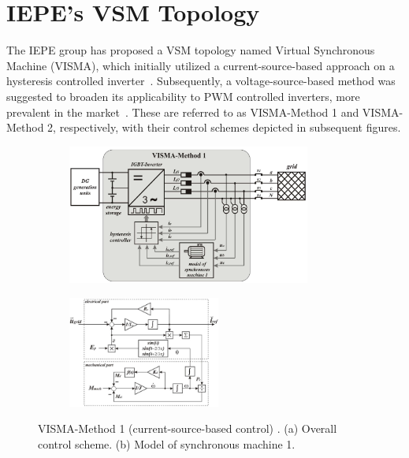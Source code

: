 \section{IEPE's VSM Topology}\label{sec:VISMA}

The IEPE group has proposed a VSM topology named Virtual Synchronous Machine
(VISMA), which initially utilized a current-source-based approach on a
hysteresis controlled inverter~\cite{beck2007vsm,chen2011improving}.
Subsequently, a voltage-source-based method was suggested to broaden its
applicability to PWM controlled inverters, more prevalent in the
market~\cite{chen2012comparison}. These are referred to as VISMA-Method 1 and
VISMA-Method 2, respectively, with their control schemes depicted in subsequent
figures.


\newpage
\begin{figure}[ht!]
    \centering
    \begin{subfigure}[b]{\textwidth}
        \centering
        \includegraphics[width=8cm]{images/VISMA1Concept.png}
        \caption{}
        \label{fig:VISMA1Concept}
    \end{subfigure}

    \begin{subfigure}[b]{\textwidth}
        \centering
        \includegraphics[width=5cm]{images/VISMA1block.png}
        \caption{}
        \label{fig:VISMA1block}
    \end{subfigure}
    \label{fig:VISMA1}
    \caption{VISMA-Method 1 (current-source-based control) \cite{chen2012comparison}. (a) Overall control scheme. (b) Model of synchronous machine 1.}
\end{figure}

